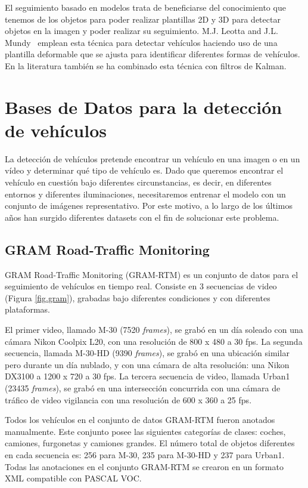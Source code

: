 El seguimiento basado en modelos trata de beneficiarse del conocimiento que tenemos de los objetos para poder realizar plantillas 2D y 3D para detectar objetos en la imagen y poder realizar su seguimiento. M.J. Leotta and J.L. Mundy~\cite{vehicle_surveillance_3d} emplean esta técnica para detectar vehículos haciendo uso de una plantilla deformable que se ajusta para identificar diferentes formas de vehículos. En la literatura también se ha combinado esta técnica con filtros de Kalman.


\section{Bases de Datos para la detección de vehículos}
\label{sec:dataset}

La detección de vehículos pretende encontrar un vehículo en una imagen o en un vídeo y determinar qué tipo de vehículo es. Dado que queremos encontrar el vehículo en cuestión bajo diferentes circunstancias, es decir, en diferentes entornos y diferentes iluminaciones, necesitaremos entrenar el modelo con un conjunto de imágenes representativo. Por este motivo, a lo largo de los últimos años han surgido diferentes datasets con el fin de solucionar este problema.

\subsection{GRAM Road-Traffic Monitoring}

GRAM Road-Traffic Monitoring (GRAM-RTM) \cite{gram-tracking} \cite{gram} es un conjunto de datos para el seguimiento de vehículos en tiempo real. Consiste en 3 secuencias de video (Figura \ref{fig.gram}), grabadas bajo diferentes condiciones y con diferentes plataformas.

El primer video, llamado M-30 (7520 \textit{frames}), se grabó en un día soleado con una cámara Nikon Coolpix L20, con una resolución de 800 x 480 a 30 \acrshort{fps}. La segunda secuencia, llamada M-30-HD (9390 \textit{frames}), se grabó en una ubicación similar pero durante un día nublado, y con una cámara de alta resolución: una Nikon DX3100 a 1200 x 720 a 30 \acrshort{fps}. La tercera secuencia de video, llamada Urban1 (23435 \textit{frames}), se grabó en una intersección concurrida con una cámara de tráfico de video vigilancia con una resolución de 600 x 360 a 25 \acrshort{fps}.

Todos los vehículos en el conjunto de datos GRAM-RTM fueron anotados manualmente. Este conjunto posee las siguientes categorías de clases: coches, camiones, furgonetas y camiones grandes. El número total de objetos diferentes en cada secuencia es: 256 para M-30, 235 para M-30-HD y 237 para Urban1. Todas las anotaciones en el conjunto GRAM-RTM se crearon en un formato XML compatible con PASCAL VOC.

